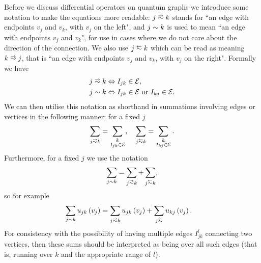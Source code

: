 Before we discuss differential operators on quantum graphs we introduce some notation to make the equations more readable: $j\conLeft k$ stands for ``an edge with endpoints $v_j$ and $v_k$, with $v_j$ on the left", and $j\sim k$ is used to mean ``an edge with endpoints $v_j$ and $v_k$", for use in cases where we do not care about the direction of the connection.
We also use $j \conRight k$ which can be read as meaning $k\conLeft j$, that is ``an edge with endpoints $v_j$ and $v_k$, with $v_j$ on the right".
Formally we have
\begin{align*}
	j\conLeft k &\Leftrightarrow I_{jk}\in \edgeSet, \\
	j\con k &\Leftrightarrow I_{jk}\in \edgeSet \text{ or } I_{kj}\in \edgeSet.
\end{align*}
We can then utilise this notation as shorthand in summations involving edges or vertices in the following manner; for a fixed $j$
\begin{align*}
	\sum_{j\conLeft k} = \sum_{\substack{k \\ I_{jk}\in \edgeSet}}, \quad
	\sum_{j\conRight k} = \sum_{\substack{k \\ I_{kj}\in \edgeSet}}.
\end{align*}
Furthermore, for a fixed $j$ we use the notation
\begin{align*}
	\sum_{j\con k} = \sum_{j\conLeft k} + \sum_{j\conRight k},
\end{align*}
so for example
\begin{align*}
	\sum_{j\con k}u_{jk}\bracs{v_j} &= \sum_{j\conLeft k}u_{jk}\bracs{v_j} + \sum_{j\conRight }u_{kj}\bracs{v_j}.
\end{align*}
For consistency with the possibility of having multiple edges $I_{jk}^l$ connecting two vertices, then these sums should be interpreted as being over all such edges (that is, running over $k$ and the appropriate range of $l$). \newline

